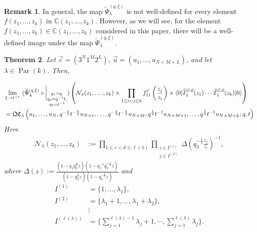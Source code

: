 \documentclass[12pt,reqno,a4paper]{amsart}
\newcommand{\comp}{\circ}
\newcommand{\cals}[1]{\mathcal{#1}}
\newcommand{\bb}[1]{\mathbb{#1}}
\numberwithin{equation}{section}
\newtheorem{thm}{Theorem}[section]
\newcommand{\quantumcorner}{\mathfrak{QC}}
\newcommand{\dualmap}{
\widetilde{\Psi}^{(q,\xi)}_{\lambda}
}
\theoremstyle{definition}
\newtheorem{rem}[thm]{Remark}
\begin{document}
\begin{rem}
In general, the map $\dualmap$ is not well-defined for every element $f(z_1,\dots,z_k)$ in $\bb{C}(z_1,\dots,z_k)$. However, as we will see, for the element $f(z_1,\dots,z_k) \in \bb{C}(z_1,\dots,z_k)$ considered in this paper, there will be a well-defined image under the map $\dualmap$. 
\end{rem}



\begin{thm}
\label{thm43-1458-25jul}
Let $\vec{c} = (3^N1^M2^L)$, $\vec{u} = (u_1,\dots,u_{N+M+L})$, and let $\lambda \in \operatorname{Par}(k)$. Then, 

\footnotesize
\begin{align}
	&
	\lim_{\xi \rightarrow t^{-1}}\,\,
	(
	\dualmap
	\comp 
	\bigg|_{
		\substack{
			q_1 = q, \\
			q_2 = q^{-1}t,\\
			q_3 = t^{-1} \\
		}
	}
	)
	\left(
	\cals{N}_{\lambda}(z_1,\dots,z_k )
	\times
	\prod_{1 \leq i < j \leq k}f^{\vec{c}}_{11}\left(\frac{z_j}{z_i} \right)
	\times
	\langle 0 |\widetilde{T}^{\vec{c},\vec{u}}_{1}(z_1 )\cdots \widetilde{T}^{\vec{c},\vec{u}}_{1}(z_k )|0\rangle
	\right)
	\\
	&= 
	\quantumcorner_\lambda\left(
	u_1,\dots,u_N, q^{-\frac{1}{2}}t^{-\frac{1}{2}}u_{N+1}, \dots, q^{-\frac{1}{2}}t^{-\frac{1}{2}}u_{N+M}, q^{\frac{1}{2}}t^{-1}u_{N+M+1}, \dots,q^{\frac{1}{2}}t^{-1}u_{N+M+L} ; q,t
	\right)
	\notag 
\end{align}
\normalsize
Here 
\begin{align}
	\cals{N}_{\lambda}(z_1,\dots,z_k )
	&:= 
	\prod_{1 \leq c < d \leq \ell(\lambda)}
	\prod_{
		\substack{
			i \in I^{(c)}
			\\
			j \in I^{(d)}
		}
	}
	\Delta\left(	q_3^{-\frac{1}{2}}\frac{z_j}{z_i}				\right)^{-1}, 
\end{align}
where $\displaystyle \Delta(z) := 
\frac{
	(1 - q_1q_3^{\frac{1}{2}}z)
	(1 - q^{-1}_1q_3^{-\frac{1}{2}}z)
}{
	(1 - q_3^{\frac{1}{2}}z)
	(1 - q_3^{-\frac{1}{2}}z)
}$ and 
\begin{align*}
	I^{(1)} &= \{1,\dots,\lambda_1\},
	\\
	I^{(2)} &= \{\lambda_1 + 1,\dots,\lambda_1 + \lambda_2\},
	\\
	&\vdots
	\\
	I^{(\ell(\lambda))} &= \{\sum_{j = 1}^{\ell(\lambda) - 1}\lambda_j+ 1, \cdots, \sum_{j = 1}^{\ell(\lambda)}\lambda_j\}. 
\end{align*}
\end{thm}
\end{document}
